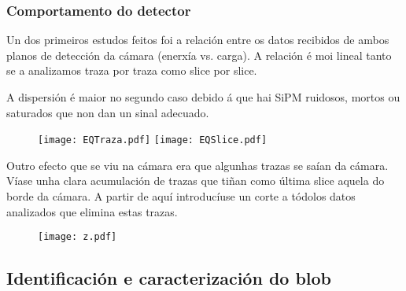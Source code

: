 \documentclass[10pt]{beamer}
\begin{document}
\begin{frame}[allowframebreaks]\frametitle{Comportamento do detector}

\bi \justifying
\item Un dos primeiros estudos feitos foi a relación entre os datos recibidos de ambos planos de detección da cámara (enerxía vs. carga). A relación é moi lineal tanto se a analizamos traza por traza como slice por slice.
\item A dispersión é maior no segundo caso debido á que hai SiPM ruidosos, mortos ou saturados que non dan un sinal adecuado.
\ei

\vspace{-0.5cm}

\begin{figure}
\centering
\texttt{[image: EQTraza.pdf]}
\texttt{[image: EQSlice.pdf]}
\end{figure}
%
%
% 
\bi \justifying
\item Outro efecto que se viu na cámara era que algunhas trazas se saían da cámara. Víase unha clara acumulación de trazas que tiñan como última slice aquela do borde da cámara. A partir de aquí introducíuse un corte a tódolos datos analizados que elimina estas trazas.
\ei

\begin{figure}
\centering
\texttt{[image: z.pdf]}
\end{figure}
 
\end{frame}

\subsection{Identificación e caracterización do blob}
\end{document}
